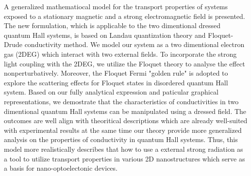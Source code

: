 A generalized mathematiocal model for the transport properties of  systems exposed to a stationary magnetic and a strong electromagnetic field is presented. The new formulation, which is applicable to the two dimentional dressed quantum Hall systems, is based on Landau quantization theory and Floquet-Drude conductivity method. We model our system as a two dimentional electron gas (2DEG) which interact with two external fields. To incorporate the strong light coupling with the 2DEG, we utilize the Floquet theory to analyse the effect nonperturbatively. Moreover, the Floquet Fermi "golden rule" is adopted to explore the scattering effects for Floquet states in disordered quantum Hall system. Based on our fully analytical expression and paticular graphical representations, we demostrate
that the characteristics of conductivities in two dimentional quantum Hall systems can be manipulated using a dressed field. The outcomes are well align with theoritical descriptions which are already well-suited with experimental results at the same time our theory provide more generalized analysis on the properties of conductivity in quantum Hall systems. Thus, this model more realistically describes that how to use a external strong radiation  as a tool to utilize transport properties in various 2D nanostructures which serve as a basis for nano-optoelectonic devices.
